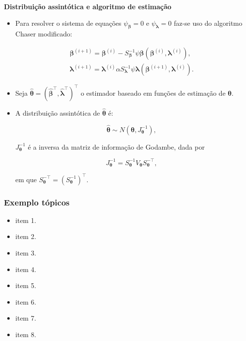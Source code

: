 \documentclass[handout,serif, professionalfont, usenames, dvipsnames, aspectratio = 169]{beamer}\usepackage[]{graphicx}\usepackage[]{color}
\begin{document}
\begin{frame}[c, allowframebreaks]

\textbf{Distribuição assintótica e algoritmo de estimação}

\begin{itemize}

  \item Para resolver o sistema de equações $\psi_{\boldsymbol{\beta}} = 0$ e $\psi_{\boldsymbol{\lambda}} = 0$ faz-se uso do algoritmo Chaser modificado:

$$
\begin{matrix}
\boldsymbol{\beta}^{(i+1)} = \boldsymbol{\beta}^{(i)}- S_{\boldsymbol{\beta}}^{-1} \psi \boldsymbol{\beta} (\boldsymbol{\beta}^{(i)}, \boldsymbol{\lambda}^{(i)}), \\ 
\boldsymbol{\lambda}^{(i+1)} = \boldsymbol{\lambda}^{(i)}\alpha S_{\boldsymbol{\lambda}}^{-1} \psi \boldsymbol{\lambda} (\boldsymbol{\beta}^{(i+1)}, \boldsymbol{\lambda}^{(i)}).
\end{matrix}
$$

  \item Seja $\boldsymbol{\hat{\theta}} = (\boldsymbol{\hat{\beta}^{\top}}, \boldsymbol{\hat{\lambda}^{\top}})^{\top}$ o estimador baseado em funções de estimação de $\boldsymbol{\theta}$.
  
  \item A distribuição assintótica de $\boldsymbol{\hat{\theta}}$ é:

$$
\boldsymbol{\hat{\theta}} \sim N(\boldsymbol{\theta}, J_{\boldsymbol{\theta}}^{-1}),
$$

\noindent $J_{\boldsymbol{\theta}}^{-1}$ é a inversa da matriz de informação de Godambe, dada por
  
$$J_{\boldsymbol{\theta}}^{-1} = S_{\boldsymbol{\theta}}^{-1} V_{\boldsymbol{\theta}} S_{\boldsymbol{\theta}}^{-\top},$$ 

\noindent em que $S_{\boldsymbol{\theta}}^{-\top} = (S_{\boldsymbol{\theta}}^{-1})^{\top}.$

\end{itemize}

\end{frame}


\begin{frame}
  \frametitle{Exemplo tópicos}
  \begin{itemize}
    \itemsep 2ex
  \item item 1. 
  \item item 2. 
  \item item 3. 
  \item item 4. 
  \item item 5. 
  \item item 6. 
  \item item 7. 
  \item item 8. 
  \end{itemize}
\end{frame}
\end{document}
